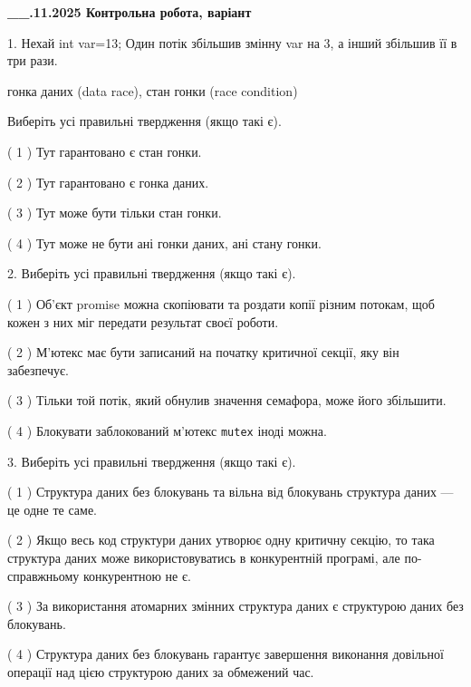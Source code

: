 \documentclass[12pt, ukrainian]{article}
\def\code#1{\Verb!#1!}
\begin{document}
\newpage
\begin {large}

\textbf{\_\_.11.2025 Контрольна робота, варіант  }\par


{
1. Нехай int var=13; Один потік збільшив змінну var на 3, а інший збільшив її в три рази.

гонка даних (data race), стан гонки (race condition)

Виберіть усі правильні твердження (якщо такі є).\par
\vspace{2mm}
( 1 ) Тут гарантовано є стан гонки.%

( 2 ) Тут гарантовано є гонка даних.%

( 3 ) Тут може бути тільки стан гонки.%

( 4 ) Тут може не бути ані гонки даних, ані стану гонки.%


2. Виберіть усі правильні твердження (якщо такі є).\par
\vspace{2mm}

( 1 ) Об’єкт promise можна скопіювати та роздати копії різним потокам, щоб кожен з них міг передати результат своєї роботи.%

( 2 ) М’ютекс має бути записаний на початку критичної секції, яку він забезпечує.%

( 3 ) Тільки той потік, який обнулив значення семафора, може його збільшити.%

( 4 ) Блокувати заблокований м’ютекс  \code{mutex} іноді можна.%


3. Виберіть усі правильні твердження (якщо такі є).\par
\vspace{2mm}

( 1 ) Структура даних без блокувань та вільна від блокувань структура даних --- це одне те саме.%

( 2 ) Якщо весь код структури даних утворює одну критичну секцію, то така структура даних може використовуватись в конкурентній програмі, але по-справжньо\-му конкурентною не є.%

( 3 ) За використання атомарних змінних структура даних є структурою даних без блокувань.%

( 4 ) Структура даних без блокувань гарантує завершення виконання довільної операції над цією структурою даних за обмежений час.%


}
\end{large}
\end{document}
